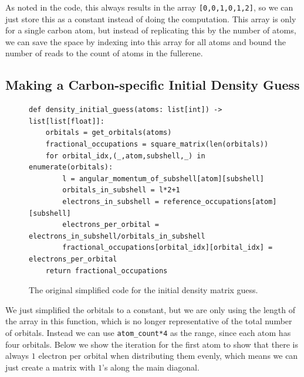 As noted in the code, this always results in the array \verb|[0,0,1,0,1,2]|, so we can just store this as a constant instead of doing the computation. This array is only for a single carbon atom, but instead of replicating this by the number of atoms, we can save the space by indexing into this array for all atoms and bound the number of reads to the count of atoms in the fullerene.


\subsection{Making a Carbon-specific Initial Density Guess}

\begin{figure}[H]
\begin{verbatim}
def density_initial_guess(atoms: list[int]) -> list[list[float]]:
    orbitals = get_orbitals(atoms)
    fractional_occupations = square_matrix(len(orbitals))
    for orbital_idx,(_,atom,subshell,_) in enumerate(orbitals):
        l = angular_momentum_of_subshell[atom][subshell] 
        orbitals_in_subshell = l*2+1 
        electrons_in_subshell = reference_occupations[atom][subshell]
        electrons_per_orbital = electrons_in_subshell/orbitals_in_subshell
        fractional_occupations[orbital_idx][orbital_idx] = electrons_per_orbital
    return fractional_occupations
\end{verbatim}
\caption{The original simplified code for the initial density matrix guess.}
\end{figure}

We just simplified the orbitals to a constant, but we are only using the length of the array in this function, which is no longer representative of the total number of orbitals. Instead we can use \verb|atom_count*4| as the range, since each atom has four orbitals. Below we show the iteration for the first atom to show that there is always $1$ electron per orbital when distributing them evenly, which means we can just create a matrix with $1$'s along the main diagonal.

